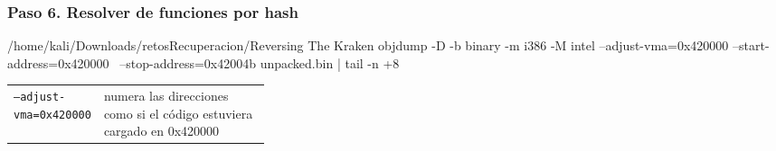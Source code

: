 \documentclass[11pt,a4paper]{article}
\begin{document}
\subsubsection*{Paso 6. Resolver de funciones por hash}
\begin{comando}{/home/kali/Downloads/retosRecuperacion/Reversing The Kraken}
objdump -D -b binary -m i386 -M intel --adjust-vma=0x420000 --start-address=0x420000 \
  --stop-address=0x42004b unpacked.bin | tail -n +8
\end{comando}
\begin{tcolorbox}[enhanced, breakable, colback=white, colframe=gray!40, boxrule=0.3pt, arc=1pt, left=4pt, right=4pt, top=2pt, bottom=2pt, fonttitle=\sffamily\scriptsize\bfseries, coltitle=black!75, colbacktitle=gray!8, title={Qué hace cada parte}, attach title to upper, before skip=2pt, after skip=4pt, fontupper=\small]
\par{\renewcommand{\arraystretch}{1.12}\begin{tabularx}{\linewidth}{@{}>{\raggedright\arraybackslash}p{0.33\linewidth}>{\raggedright\arraybackslash}X@{}}
\texttt{--adjust-vma=\allowbreak{}0x420000} & numera las direcciones como si el código estuviera cargado en 0x420000 \\
\end{tabularx}}
\end{tcolorbox}
\end{document}
